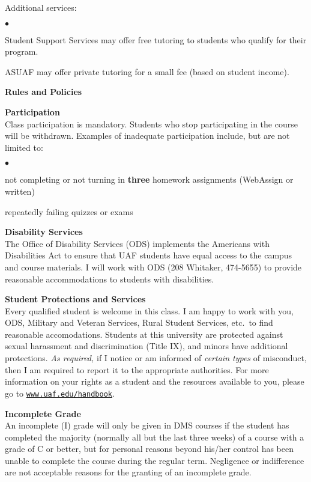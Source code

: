 \documentclass[12pt]{article}
\renewcommand{\emph}[1]{\textsf{\textbf{#1}}}
\newcommand{\localhead}[1]{\par\smallskip\textbf{#1}\nobreak\\}%
\def\heading#1{\localhead{\large\emph{#1}}}
\def\subheading#1{\localhead{\emph{#1}}}
\newenvironment{clist}%
{\bgroup\parskip 0pt\begin{list}{$\bullet$}{\partopsep 4pt\topsep 0pt\itemsep -2pt}}%
{\end{list}\egroup}%
\begin{document}
Additional services:
\begin{clist}
	\item Student Support Services may offer free tutoring to students who qualify for their program.
	\item ASUAF may offer private tutoring for a small fee (based on student income).
\end{clist}


\newpage
\strut

\heading{Rules and Policies}
\vskip -20pt
\subheading{Participation}
Class participation is mandatory.  Students who stop participating in the course will be withdrawn.  Examples of inadequate participation include, but are not limited to:

\begin{clist}
\item not completing or not turning in \textbf{three} homework assignments (WebAssign or written)
\item repeatedly failing quizzes or exams
\end{clist}

\subheading{Disability Services}
The Office of Disability Services (ODS) implements the Americans with Disabilities Act to ensure that UAF students have equal access to the campus and course materials.  I will work with ODS (208 Whitaker, 474-5655) to provide reasonable accommodations to students with disabilities.

\subheading{Student Protections and Services}
Every qualified student is welcome in this class.  I am happy to work with you, ODS, Military and Veteran Services, Rural Student Services, etc.~to find reasonable accomodations.  Students at this university are protected against sexual harassment and discrimination (Title IX), and minors have additional protections. \textit{As required,} if I notice or am informed of \textit{certain types} of misconduct, then I am required to report it to the appropriate authorities.  For more information on your rights as a student and the resources available to you, please go to \href{https://www.uaf.edu/handbook/}{\texttt{www.uaf.edu/handbook}}.

\subheading{Incomplete Grade} 
An incomplete (I) grade will only be given in DMS courses if the student has completed the majority (normally all but the last three weeks) of a course with a grade of C or better, but for personal reasons beyond his/her control has been unable to complete the course during the regular term. Negligence or indifference are not acceptable reasons for the granting of an incomplete grade. 
\end{document}
